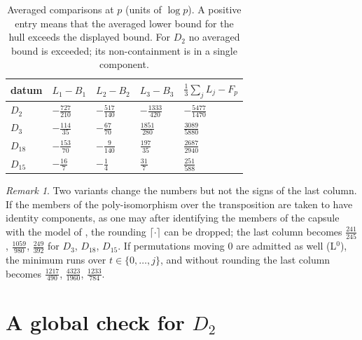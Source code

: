 \documentclass[11pt]{amsart}
\theoremstyle{remark}
\newtheorem{remark}[theorem]{Remark}
\begin{document}
\begin{table}[ht]
\centering\small
\begin{tabular}{@{}lllll@{}}
\toprule
datum & $L_1-B_1$ & $L_2-B_2$ & $L_3-B_3$ & $\tfrac13\sum_jL_j-F_p$\\
\midrule
$D_2$ & $-\tfrac{727}{210}$ & $-\tfrac{517}{140}$ & $-\tfrac{1333}{420}$ & $-\tfrac{5477}{1470}$\\
$D_3$ & $-\tfrac{114}{35}$ & $-\tfrac{67}{70}$ & $\tfrac{1851}{280}$ & $\tfrac{3089}{5880}$\\
$D_{18}$ & $-\tfrac{153}{70}$ & $-\tfrac9{140}$ & $\tfrac{197}{35}$ & $\tfrac{2687}{2940}$\\
$D_{15}$ & $-\tfrac{16}7$ & $-\tfrac14$ & $\tfrac{31}7$ & $\tfrac{251}{588}$\\
\bottomrule
\end{tabular}
\caption{Averaged comparisons at $p$ (units of $\log p$). A positive entry means that the averaged lower bound for the
hull exceeds the displayed bound. For $D_2$ no averaged bound is exceeded; its non-containment is in a single
component.}\label{tab:average}
\end{table}

\begin{remark}
Two variants change the numbers but not the signs of the last column. If the members of the poly-isomorphism over
the transposition are taken to have identity components, as one may after identifying the members of the capsule with
the model of \cite[Def.~4.1(iii)]{IUT1}, the rounding $\lceil\cdot\rceil$ can be dropped; the last column
becomes $\tfrac{241}{245}$, $\tfrac{1059}{980}$, $\tfrac{249}{392}$ for $D_3$, $D_{18}$, $D_{15}$. If permutations
moving $0$ are admitted as well (L$^0$), the minimum runs over $t\in\{0,\dots,j\}$, and without rounding the last
column becomes $\tfrac{1217}{490}$, $\tfrac{4323}{1960}$, $\tfrac{1233}{784}$.
\end{remark}

\section{A global check for \texorpdfstring{$D_2$}{D2}}\label{s:global}
\end{document}

